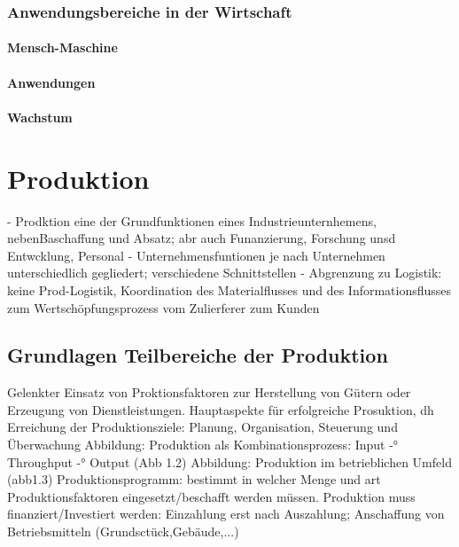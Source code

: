 \documentclass[a4paper,12pt, german]{report}
\begin{document}
\subsubsection{Anwendungsbereiche in der Wirtschaft}

\paragraph{Mensch-Maschine}


\paragraph{Anwendungen}


\paragraph{Wachstum}





\section{Produktion}

- Prodktion eine der Grundfunktionen eines Industrieunternhemens, nebenBaschaffung und Absatz; abr auch Funanzierung, Forschung unsd Entwcklung, Personal 
- Unternehmensfuntionen je nach Unternehmen unterschiedlich gegliedert; verschiedene Schnittstellen
- Abgrenzung zu Logistik: keine Prod-Logistik, Koordination des Materialflusses und des Informationsflusses zum Wertschöpfungsprozess vom Zulierferer zum Kunden
\cite{07}




\subsection{Grundlagen Teilbereiche der Produktion}

Gelenkter Einsatz von Proktionsfaktoren zur Herstellung von Gütern oder Erzeugung von Dienstleistungen. Hauptaspekte für erfolgreiche Prosuktion, dh Erreichung der Produktionsziele: Planung, Organisation, Steuerung und Überwachung 
Abbildung: Produktion als Kombinationsprozess: Input -° Throughput -° Output (Abb 1.2)
Abbildung: Produktion im betrieblichen Umfeld (abb1.3)
Produktionsprogramm: bestimmt in welcher Menge und art Produktionsfaktoren eingesetzt/beschafft werden müssen.
Produktion muss finanziert/Investiert werden: Einzahlung erst nach Auszahlung; Anschaffung von Betriebsmitteln (Grundsctück,Gebäude,...)
\cite{07}
\end{document}
